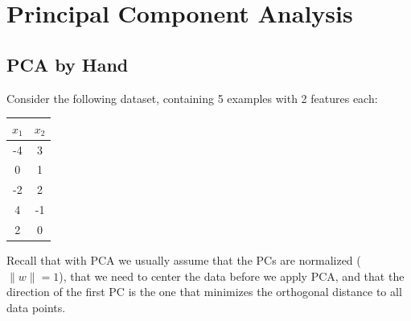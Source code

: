\documentclass{article}
\def\norm#1{\|#1\|}
\begin{document}
\section{Principal Component Analysis}

\subsection{PCA by Hand}

Consider the following dataset, containing 5 examples with 2 features each:
\begin{center}
\begin{tabular}{cc}
$x_1$ & $x_2$\\
\hline
-4 & 3\\
0 & 1\\
-2 & 2\\
4 & -1\\
2 & 0\\
\end{tabular}
\end{center}
Recall that with PCA we usually assume that the PCs are normalized ($\norm{w} = 1$), that we need to center the data before we apply PCA, and that the direction of the first PC is the one that minimizes the orthogonal distance to all data points.
\end{document}
